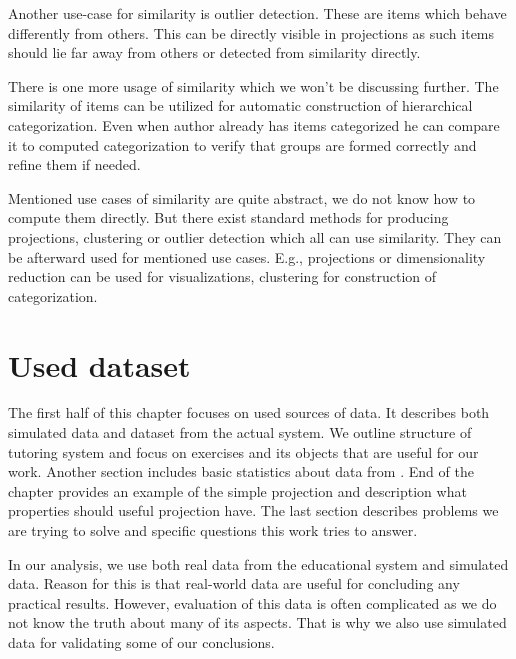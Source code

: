 \documentclass[
  digital, %
  table,   %
  nolof,     %
  nolot,     %
  nocover,
  color,
  final, %
]{fithesis3}
\begin{document}
Another use-case for similarity is outlier detection. These are items which behave differently from others. This can be directly visible in projections as such items should lie far away from others or detected from similarity directly.

There is one more usage of similarity which we won't be discussing further. The similarity of items can be utilized for automatic construction of hierarchical categorization. Even when author already has items categorized he can compare it to computed categorization to verify that groups are formed correctly and refine them if needed.


Mentioned use cases of similarity are quite abstract, we do not know how to compute them directly. But there exist standard methods for producing projections, clustering or outlier detection which all can use similarity. They can be afterward used for mentioned use cases. E.g., projections or dimensionality reduction can be used for visualizations, clustering for construction of categorization.


\chapter{Used dataset}\label{used-dataset}

The first half of this chapter focuses on used sources of data. It describes both simulated data and dataset from the actual system. We outline structure of tutoring system and focus on exercises and its objects that are useful for our work. Another section includes basic statistics about data from \umimeCesky{}. End of the chapter provides an example of the simple projection and description what properties should useful projection have. The last section describes problems we are trying to solve and specific questions this work tries to answer.


In our analysis, we use both real data from the educational system and simulated data. Reason for this is that real-world data are useful for concluding any practical results. However, evaluation of this data is often complicated as we do not know the truth about many of its aspects. That is why we also use simulated data for validating some of our conclusions.
\end{document}
